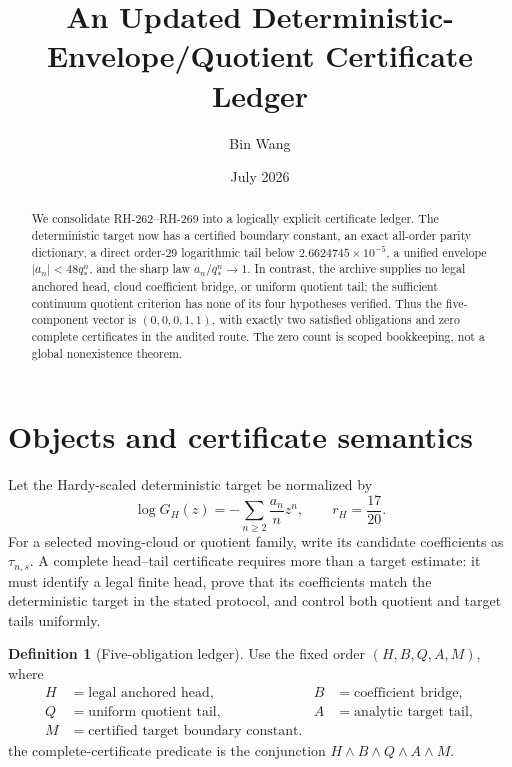 \documentclass[11pt]{article}
\title{An Updated Deterministic-Envelope/Quotient Certificate Ledger}
\author{Bin Wang}
\date{July 2026}
\theoremstyle{definition}
\newtheorem{definition}[theorem]{Definition}
\theoremstyle{remark}
\begin{document}
\maketitle

\begin{abstract}
We consolidate RH-262--RH-269 into a logically explicit certificate ledger.
The deterministic target now has a certified boundary constant, an exact
all-order parity dictionary, a direct order-29 logarithmic tail below
$2.6624745\times10^{-5}$, a unified envelope
$|a_n|<48q_*^n$, and the sharp law $a_n/q_*^n\to1$.  In contrast, the
archive supplies no legal anchored head, cloud coefficient bridge, or uniform
quotient tail; the sufficient continuum quotient criterion has none of its
four hypotheses verified.  Thus the five-component vector is
$(0,0,0,1,1)$, with exactly two satisfied obligations and zero complete
certificates in the audited route.  The zero count is scoped bookkeeping, not
a global nonexistence theorem.
\end{abstract}

\section{Objects and certificate semantics}

Let the Hardy-scaled deterministic target be normalized by
\begin{equation}
 \log G_H(z)=-\sum_{n\ge2}\frac{a_n}{n}z^n,
 \qquad r_H=\frac{17}{20}.
 \label{eq:target}
\end{equation}
For a selected moving-cloud or quotient family, write its candidate
coefficients as $\tau_{n,s}$.  A complete head--tail certificate requires
more than a target estimate: it must identify a legal finite head, prove that
its coefficients match the deterministic target in the stated protocol, and
control both quotient and target tails uniformly.

\begin{definition}[Five-obligation ledger]\label{def:ledger}
Use the fixed order $(H,B,Q,A,M)$, where
\begin{equation}
\begin{aligned}
 H&=\text{legal anchored head},&
 B&=\text{coefficient bridge},\\
 Q&=\text{uniform quotient tail},&
 A&=\text{analytic target tail},\\
 M&=\text{certified target boundary constant}.&&
\end{aligned}
\label{eq:vector}
\end{equation}
the complete-certificate predicate is the conjunction
$H\wedge B\wedge Q\wedge A\wedge M$.
\end{definition}
\end{document}
